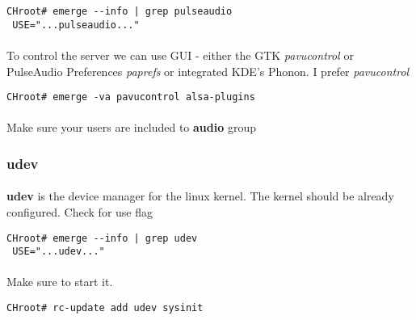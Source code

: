 \documentclass[10pt,a4paper]{article}
\begin{document}
                    \begin{lstlisting}[style=BashInputCHRoot]
 CHroot# emerge --info | grep pulseaudio
 USE="...pulseaudio..."
                    \end{lstlisting}

                    \paragraph{} To control the server we can use GUI - either the GTK \textit{pavucontrol} or PulseAudio Preferences \textit{paprefs} or integrated KDE's Phonon. I prefer \textit{pavucontrol}

                    \begin{lstlisting}[style=BashInputCHRoot]
 CHroot# emerge -va pavucontrol alsa-plugins
                    \end{lstlisting}

                    \paragraph{} Make sure your users are included to \textbf{audio} group

                \newpage
                \subsubsection{udev}

                    \paragraph{} \textbf{udev} is the device manager for the linux kernel. The kernel should be already configured. Check for use flag

                    \begin{lstlisting}[style=BashInputCHRoot]
 CHroot# emerge --info | grep udev
 USE="...udev..."
                    \end{lstlisting}

                    \paragraph{} Make sure to start it.

                    \begin{lstlisting}[style=BashInputCHRoot]
 CHroot# rc-update add udev sysinit
                    \end{lstlisting}
\end{document}
